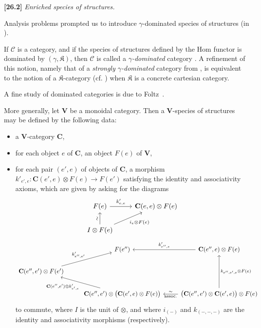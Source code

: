 \documentclass[a4paper,fleqn]{article}
\theoremstyle{plain}
\theoremstyle{definition}
\newenvironment{longcomm}[1]
  {\noindent\textbf{[#1]}\rmfamily}
  {}
\newcommand{\CC}{\mathcal{C}}
\newcommand{\KK}{\mathfrak{K}}
\begin{document}
\begin{longcomm}{26.2}
  \emph{Enriched species of structures.}

  Analysis problems prompted us to introduce $\gamma$-dominated species of structures (in \cite{comm28}).

  If $\CC$ is a category, and if the species of structures defined by the Hom functor is dominated by $(\gamma,\KK)$, then $\CC$ is called a \emph{$\gamma$-dominated} category \cite{coll77}.
  A refinement of this notion, namely that of a \emph{strongly $\gamma$-dominated} category from \cite{coll104,coll109}, is equivalent to the notion of a $\KK$-category (cf. \cite{comm31}) when $\KK$ is a concrete cartesian category.

  A fine study of dominated categories is due to Foltz~\cite{comm33}.

  More generally, let $\mathbf{V}$ be a monoidal category.
  Then a {$\mathbf{V}$-species of structures} may be defined by the following data:
  \begin{itemize}
    \item a $\mathbf{V}$-category $\mathbf{C}$,

    \item for each object $e$ of $\mathbf{C}$, an object $F(e)$ of $\mathbf{V}$,

    \item for each pair $(e',e)$ of objects of $\mathbf{C}$, a morphism $k'_{e',e}\colon\mathbf{C}(e',e)\otimes F(e)\to F(e')$ satisfying the identity and associativity axioms, which are given by asking for the diagrams
    \[
      \begin{tikzcd}
        F(e)
          \ar[r,"k'_{e,e}"]
        & \mathbf{C}(e,e)\otimes F(e)
      \\I\otimes F(e)
          \ar[u,"\sim"{anchor=south,rotate=90}]
          \ar[ur,swap,"i_e\otimes F(e)"]
      \end{tikzcd}
    \]
    \[
      \begin{tikzcd}
        & F(e'')
        & \mathbf{C}(e'',e)\otimes F(e)
          \ar[l,swap,"k'_{e'',e}"]
      \\\mathbf{C}(e'',e')\otimes F(e')
          \ar[ur,"k'_{e'',e'}"]
      \\& \mathbf{C}(e'',e')\otimes\big(\mathbf{C}(e',e)\otimes F(e)\big)
          \ar[ul,"{\mathbf{C}(e'',e')\otimes k'_{e',e}}"]
        & \big(\mathbf{C}(e'',e')\otimes\mathbf{C}(e',e)\big)\otimes F(e)
          \ar[l,swap,"\sim","\mathrm{assoc.}"{below}]
          \ar[uu,swap,"k_{e'',e',e}\otimes F(e)"]
      \end{tikzcd}
    \]
    to commute, where $I$ is the unit of $\otimes$, and where $i_{(-)}$ and $k_{(-,-,-)}$ are the identity and associativity morphisms (respectively).
  \end{itemize}


\end{longcomm}
\end{document}
